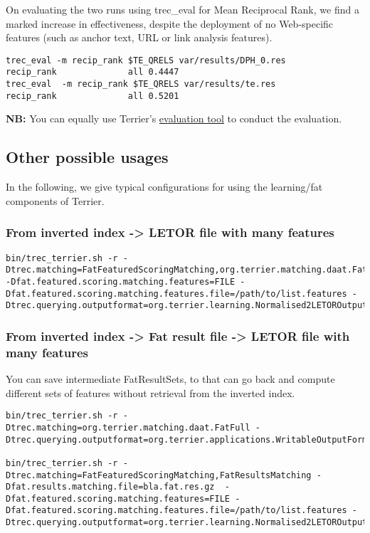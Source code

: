 On evaluating the two runs using trec\_eval for Mean Reciprocal Rank, we
find a marked increase in effectiveness, despite the deployment of no
Web-specific features (such as anchor text, URL or link analysis
features).

\begin{verbatim}
trec_eval -m recip_rank $TE_QRELS var/results/DPH_0.res
recip_rank              all 0.4447
trec_eval  -m recip_rank $TE_QRELS var/results/te.res 
recip_rank              all 0.5201
\end{verbatim}

\textbf{NB:} You can equally use Terrier's
\href{evaluation.html}{evaluation tool} to conduct the evaluation.

\href{}{}

\subsection{Other possible usages}\label{other-possible-usages}

In the following, we give typical configurations for using the
learning/fat components of Terrier.

\subsubsection{From inverted index -\textgreater{} LETOR file with many
features}\label{from-inverted-index---letor-file-with-many-features}

\begin{verbatim}
bin/trec_terrier.sh -r -Dtrec.matching=FatFeaturedScoringMatching,org.terrier.matching.daat.FatFull -Dfat.featured.scoring.matching.features=FILE -Dfat.featured.scoring.matching.features.file=/path/to/list.features -Dtrec.querying.outputformat=org.terrier.learning.Normalised2LETOROutputFormat
\end{verbatim}

\subsubsection{From inverted index -\textgreater{} Fat result file
-\textgreater{} LETOR file with many
features}\label{from-inverted-index---fat-result-file---letor-file-with-many-features}

You can save intermediate FatResultSets, to that can go back and compute
different sets of features without retrieval from the inverted index.

\begin{verbatim}
bin/trec_terrier.sh -r -Dtrec.matching=org.terrier.matching.daat.FatFull -Dtrec.querying.outputformat=org.terrier.applications.WritableOutputFormat

bin/trec_terrier.sh -r -Dtrec.matching=FatFeaturedScoringMatching,FatResultsMatching -Dfat.results.matching.file=bla.fat.res.gz  -Dfat.featured.scoring.matching.features=FILE -Dfat.featured.scoring.matching.features.file=/path/to/list.features -Dtrec.querying.outputformat=org.terrier.learning.Normalised2LETOROutputFormat
\end{verbatim}

